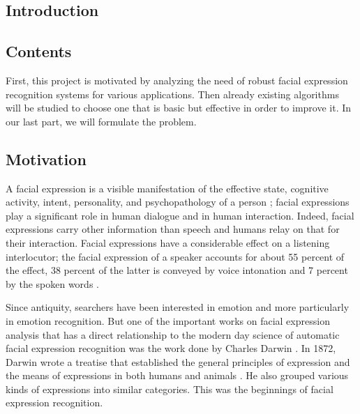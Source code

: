   \begin{titlepage}
    \vspace*{\fill}
      \part{Introduction}
    \vspace*{\fill}
  \end{titlepage}

\chapter*{Contents}
First, this project is motivated by analyzing the need of robust facial expression recognition systems for various applications. Then already existing algorithms will be studied to choose one that is basic but effective in order to improve it. In our last part, we will formulate the problem.
\newpage

\chapter{Motivation}

A facial expression is a visible manifestation of the effective state, cognitive activity, intent, personality, and psychopathology of a person \cite{DON99}; facial expressions play a significant role in human dialogue and in human interaction. Indeed, facial expressions carry other information than speech and humans relay on that for their interaction. Facial expressions have a considerable effect on a listening interlocutor; the facial expression of a speaker accounts for about 55 percent of the effect, 38 percent of the latter is conveyed by voice intonation and 7 percent by the spoken words \cite{PAN00}.
\newline

\noindent Since antiquity, searchers have been interested in emotion and more particularly in emotion recognition. But one of the important works on facial expression analysis that has a direct relationship to the modern day science of automatic facial expression recognition was the work done by Charles Darwin \cite{BET12}. In 1872, Darwin wrote a treatise that established the general principles of expression and the means of expressions in both humans and animals \cite{DAR04}. He also grouped various kinds of expressions into similar categories. This was the beginnings of facial expression recognition.
\newline


